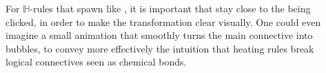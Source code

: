 \begin{scope}
\begin{description}
  \item[\textbf{\heating}]
    For $\mathbb{H}$-rules that spawn  like {\rnm{\land{+}}}, it is
    important that  stay close to the  being clicked, in order to
    make the transformation clear visually. One could even imagine a small
    animation that smoothly turns the main connective into bubbles, to convey
    more effectively the intuition that heating rules break logical connectives
    seen as chemical bonds.

\end{description}


\end{scope}
